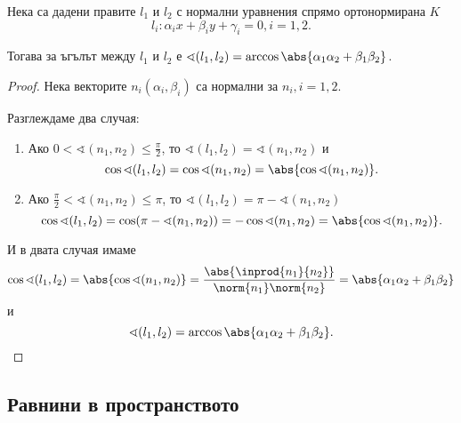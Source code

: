 \documentclass{../../common/topic}
\begin{document}
\begin{theorem}
  Нека са дадени правите \( l_1 \) и \( l_2 \) с нормални уравнения спрямо ортонормирана \( K \)
  \begin{equation*}
    l_i: \alpha_i x + \beta_i y + \gamma_i = 0, i = 1, 2.
  \end{equation*}

  Тогава за ъгълът между \( l_1 \) и \( l_2 \) е \( \sphericalangle(l_1, l_2) = \arccos \abs{\alpha_1 \alpha_2 + \beta_1 \beta_2} \).
\end{theorem}
\begin{proof}
  Нека векторите \( n_i(\alpha_i, \beta_i) \) са нормални за \( n_i, i = 1, 2 \).

  Разглеждаме два случая:
  \begin{enumerate}
    \item Ако \( 0 < \sphericalangle(n_1, n_2) \leq \frac {\pi} 2 \), то \( \sphericalangle(l_1, l_2) = \sphericalangle(n_1, n_2) \) и
    \begin{equation*}
      \cos \sphericalangle (l_1, l_2)
      =
      \cos \sphericalangle(n_1, n_2)
      =
      \abs{\cos \sphericalangle (n_1, n_2)}.
    \end{equation*}

    \item Ако \( \frac {\pi} 2 < \sphericalangle(n_1, n_2) \leq \pi \), то \( \sphericalangle(l_1, l_2) = \pi - \sphericalangle(n_1, n_2) \)
    \begin{equation*}
      \cos \sphericalangle (l_1, l_2)
      =
      \cos (\pi - \sphericalangle(n_1, n_2))
      =
      -\cos \sphericalangle(n_1, n_2)
      =
      \abs{\cos \sphericalangle (n_1, n_2)}.
    \end{equation*}
  \end{enumerate}

  И в двата случая имаме
  \begin{equation*}
    \cos \sphericalangle(l_1, l_2)
    =
    \abs{\cos \sphericalangle(n_1, n_2)}
    =
    \frac {\abs{\inprod {n_1} {n_2}}} {\norm{n_1} \norm{n_2}}
    =
    \abs{\alpha_1 \alpha_2 + \beta_1 \beta_2}
  \end{equation*}
  и
  \begin{equation*}
    \sphericalangle(l_1, l_2)
    =
    \arccos \abs{\alpha_1 \alpha_2 + \beta_1 \beta_2}.
  \end{equation*}
\end{proof}

\subsection{Равнини в пространството}
\end{document}
